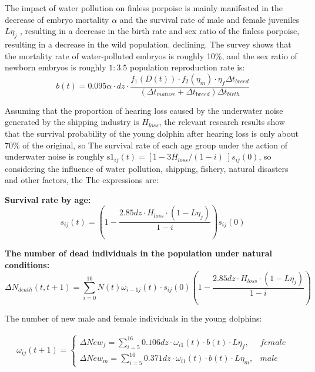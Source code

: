 \documentclass[12pt]{article}  %
\begin{document}
The impact of water pollution on finless porpoise is mainly manifested in the decrease of embryo mortality $\alpha $ and the survival rate of male and female juveniles $L{{\eta }_{j}}$  , resulting in a decrease in the birth rate and sex ratio of the finless porpoise, resulting in a decrease in the wild population. declining.
The survey shows that the mortality rate of water-polluted embryos is roughly 10\%, and the sex ratio of newborn embryos is roughly $1:3.5$
population reproduction rate is:
\begin{equation}
b(t)=0.095\alpha \cdot dz\cdot \frac{{{f}_{1}}(D(t))\cdot {{f}_{2}}({{\eta }_{m}})\cdot {{\eta }_{f}}\Delta {{t}_{breed}}}{(\Delta {{t}_{mature}}+\Delta {{t}_{\text{br}eed}})\Delta {{t}_{birth}}}   
\end{equation}


Assuming that the proportion of hearing loss caused by the underwater noise generated by the shipping industry is ${{H}_{loss}}$, the relevant research results show that the survival probability of the young dolphin after hearing loss is only about 70\% of the original, so The survival rate of each age group under the action of underwater noise is roughly $\text{s}{{\text{1}}_{ij}}(t)=\left[ 1-{3{{H}_{loss} }}/{(1-i)}\; \right]{{s}_{ij}}(0)$, so considering the influence of water pollution, shipping, fishery, natural disasters and other factors, the The expressions are:

\textbf{Survival rate by age:}
\begin{equation}
{{s}_{ij}}(t)=\left( 1-\frac{2.85dz\cdot {{H}_{loss}}\cdot (1-L{{\eta }_{j}})}{1-i} \right){{s}_{ij}}(0)   
\end{equation}


\textbf{The number of dead individuals in the population under natural conditions:}
\begin{equation}
\Delta {{N}_{death}}(t,t+1)=\sum\limits_{i=0}^{16}{N(t){{\omega }_{i-1j}}(t)\cdot {{s}_{ij}}(0)\left( 1-\frac{2.85dz\cdot {{H}_{loss}}\cdot (1-L{{\eta }_{j}})}{1-i} \right)} 
\end{equation}


The number of new male and female individuals in the young dolphins:

\begin{equation}
\begin{aligned}
{{\omega }_{i j}}(t+1)= \left \{
\begin{array}{ll}
\Delta Ne{{w}_{f}}=\sum\limits_{i=5}^{16}{0.106dz\cdot {{\omega }_{i1}}(t)\cdot b(t)}\cdot L{{\eta }_{f}},   & female\\
\Delta Ne{{w}_{m}}=\sum\limits_{i=5}^{16}{0.371dz\cdot {{\omega }_{i1}}(t)\cdot b(t)}\cdot L{{\eta }_{m}},  &male
\end{array}
\right.
\end{aligned}
\end{equation}
\end{document}
